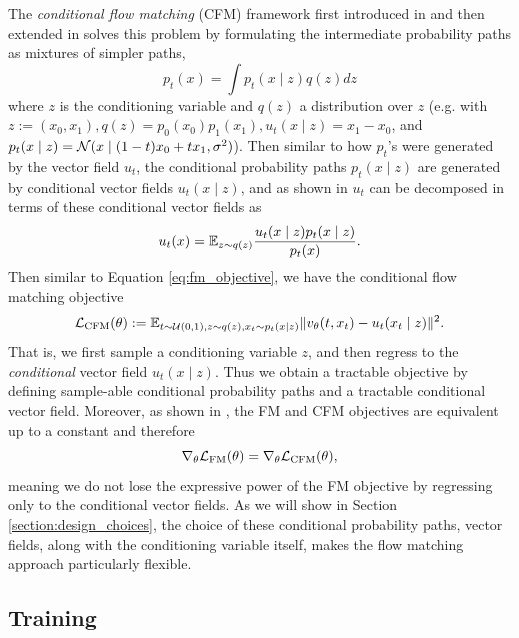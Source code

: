 The \textit{conditional flow matching} (CFM) framework first introduced in \citep{lipmanFlowMatchingGenerative2023} and then extended in \citep{tongImprovingGeneralizingFlowbased2023} solves this problem by formulating the intermediate probability paths as mixtures of simpler paths, 
\begin{equation}
    p_t(x) = \int p_t(x \mid z) q(z) dz
\end{equation}
where $z$ is the conditioning variable and $q(z)$ a distribution over $z$ (e.g. with $z := (x_0, x_1), q(z) = p_0(x_0)p_1(x_1), u_t(x \mid z) = x_1 - x_0$, and $p_t(x \mid z) = \mathcal{N}(x \mid (1-t)x_0 + tx_1, \sigma^2)$). Then similar to how $p_t$'s were generated by the vector field $u_t$, the conditional probability paths $p_t(x \mid z)$ are generated by conditional vector fields $u_t(x \mid z)$, and as shown in \citep{tongImprovingGeneralizingFlowbased2023} $u_t$ can be decomposed in terms of these conditional vector fields as 
\begin{equation}
    u_t(x) = \mathbb{E}_{z \sim q(z)} \frac{u_t(x \mid z) p_t(x \mid z)}{p_t(x)}.
\end{equation}
Then similar to Equation \ref{eq:fm_objective}, we have the conditional flow matching objective 
\begin{equation} \label{eq:cfm_objective}
    \mathcal{L}_{\text{CFM}}(\theta) := \mathbb{E}_{t \sim \mathcal{U}(0,1), z \sim q(z), x_t \sim p_t(x \mid z)}
    \Vert v_\theta(t, x_t) - u_t(x_t \mid z) \Vert ^2.
\end{equation}
That is, we first sample a conditioning variable $z$, and then regress to the \textit{conditional} vector field $u_t(x \mid z)$. Thus we obtain a tractable objective by defining sample-able conditional probability paths and a tractable conditional vector field. Moreover, as shown in \citep{tongImprovingGeneralizingFlowbased2023}, the FM and CFM objectives are equivalent up to a constant and therefore
\begin{equation}
    \nabla_\theta \mathcal{L}_{\text{FM}}(\theta) = \nabla_\theta \mathcal{L}_{\text{CFM}}(\theta),
\end{equation}
meaning we do not lose the expressive power of the FM objective by regressing only to the conditional vector fields. As we will show in Section \ref{section:design_choices}, the choice of these conditional probability paths, vector fields, along with the conditioning variable itself, makes the flow matching approach particularly flexible.

\subsection{Training} \label{sec:fm_training}

